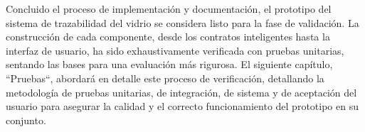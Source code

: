Concluido el proceso de implementación y documentación, el prototipo del sistema de trazabilidad del vidrio se considera listo para la fase de validación. La construcción de cada componente, desde los contratos inteligentes hasta la interfaz de usuario, ha sido exhaustivamente verificada con pruebas unitarias, sentando las bases para una evaluación más rigurosa. El siguiente capítulo, ``Pruebas``, abordará en detalle este proceso de verificación, detallando la metodología de pruebas unitarias, de integración, de sistema y de aceptación del usuario para asegurar la calidad y el correcto funcionamiento del prototipo en su conjunto.
